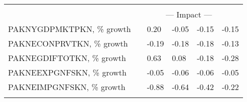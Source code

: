 \documentclass{article}
\begin{document}
\begin{table}
\begin{tabular}{llllll}
&\multicolumn{5}{c}{     }                                                                                                     \\
&\multicolumn{5}{c}{--- Impact ---}                                                                                                     \\
PAKNYGDPMKTPKN, \% growth &                      &                 0.20 &                -0.05 &                -0.15 &                -0.15 \\
PAKNECONPRVTKN, \% growth &                      &                -0.19 &                -0.18 &                -0.18 &                -0.13 \\
PAKNEGDIFTOTKN, \% growth &                      &                 0.63 &                 0.08 &                -0.18 &                -0.28 \\
PAKNEEXPGNFSKN, \% growth &                      &                -0.05 &                -0.06 &                -0.06 &                -0.05 \\
PAKNEIMPGNFSKN, \% growth &                      &                -0.88 &                -0.64 &                -0.42 &                -0.22 \\
&\multicolumn{5}{c}{     }                                                                                                     \\
\bottomrule
\end{tabular}
\end{table}
\end{document}
